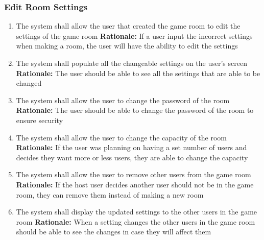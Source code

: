 \documentclass[12pt]{article}
\begin{document}
\subsubsection{Edit Room Settings}
\begin{enumerate}[label=RS\arabic*., series=EditRoom]
	\item The system shall allow the user that created the game room to edit the settings of the game room\newline 
    \textbf{Rationale:} If a user input the incorrect settings when making a room, the user will have the ability to edit the settings 
    \item The system shall populate all the changeable settings on the user's screen\newline 
    \textbf{Rationale:} The user should be able to see all the settings that are able to be changed
    \item The system shall allow the user to change the password of the room\newline 
    \textbf{Rationale:} The user should be able to change the password of the room to ensure security
    \item The system shall allow the user to change the capacity of the room\newline 
    \textbf{Rationale:} If the user was planning on having a set number of users and decides they want more or less users, they are able to change the capacity
    \item The system shall allow the user to remove other users from the game room\newline 
    \textbf{Rationale:} If the host user decides another user should not be in the game room, they can remove them instead of making a new room
    \item The system shall display the updated settings to the other users in the game room\newline 
    \textbf{Rationale:} When a setting changes the other users in the game room should be able to see the changes in case they will affect them
\end{enumerate}
\end{document}
